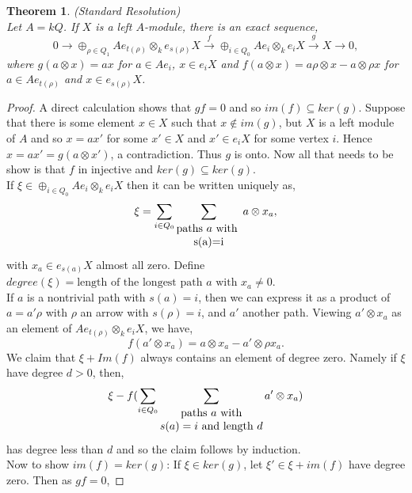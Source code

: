\documentclass[11.5pt, twoside, a4paper, titlepage]{report}
\makeatletter
\theoremstyle{definition}
\theoremstyle{plain}
\newtheorem{thm}[mydef]{Theorem}
\newcommand{\mytab}[1]{%
\begin{tabular}{@{}c@{}}
#1
\end{tabular}
}
\makeatother
\begin{document}
\begin{thm} \label{standardresthm} (Standard Resolution) \\
Let $A=kQ$. If $X$ is a left $A$-module, there is an exact sequence,
\begin{equation*}
0 \xrightarrow{} \oplus_{\rho \in Q_1} Ae_{t(\rho)}\otimes_k e_{s(\rho)}X \xrightarrow{f} \oplus_{i\in Q_0} Ae_i \otimes_ke_iX \xrightarrow{g} X \xrightarrow{}0,
\end{equation*}
where $g(a\otimes x)=ax$ for $a\in Ae_i$, $x\in e_iX$ and $f(a\otimes x)=a\rho\otimes x -a\otimes \rho x$ for $a \in Ae_{t(\rho)}$ and $x\in e_{s(\rho)}X$. 
\end{thm}
\begin{proof}
A direct calculation shows that $gf=0$ and so $im(f)\subseteq ker(g)$. Suppose that there is some element $x \in X$ such that $x\notin im(g)$, but $X$ is a left module of $A$ and so $x=ax'$ for some $x'\in X$ and $x'\in e_iX$ for some vertex $i$. Hence $x=ax'=g(a\otimes x')$, a contradiction. Thus $g$ is onto. Now all that needs to be show is that $f$ in injective and $ker(g)\subseteq ker(g)$.\\
If $\xi \in \oplus_{i\in Q_0} Ae_i \otimes_k e_iX$ then it can be written uniquely as,
\begin{equation*}
\xi=  \sum_{i\in Q_0}\sum_{\mytab{\text{paths $a$ with }\\s(a)=i}} a \otimes x_a,
\end{equation*}
with $x_a\in e_{s(a)}X$ almost all zero. Define $degree(\xi)=\text{length of the longest path $a$ with $x_a\neq0$}$.\\
If $a$ is a nontrivial path with $s(a)=i$, then we can express it as a product of $a=a'\rho$ with $\rho$ an arrow with $s(\rho)=i$, and $a'$ another path. Viewing $a'\otimes x_a$ as an element of $Ae_{t(\rho)}\otimes_k e_iX$, we have,
\begin{equation*}
f(a' \otimes x_a)=a\otimes x_a -a'\otimes \rho x_a.
\end{equation*}
We claim that $\xi + Im(f)$ always contains an element of degree zero. Namely if $\xi $ have degree $d>0$, then, 
\begin{equation*}
\xi - f( \sum_{i \in Q_0} \sum_{\mytab{\text{paths $a$ with}\\ \text{$s(a)=i$ and length $d$}}}a' \otimes x_a)
\end{equation*}
has degree less than $d$ and so the claim follows by induction.\\
Now to show $im(f)=ker(g)$: If $\xi \in ker(g)$, let $\xi' \in \xi + im(f)$ have degree zero. Then as $gf=0$, 

\end{proof}
\end{document}
